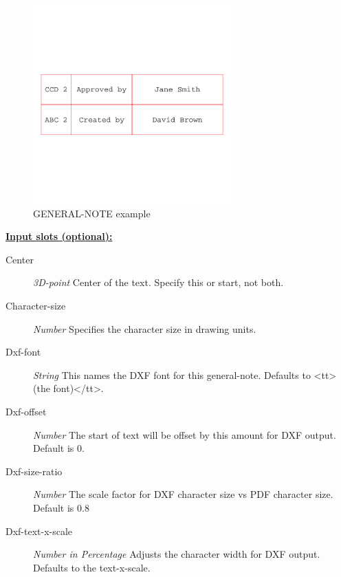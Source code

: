 \documentclass [11pt]{book}
\begin{document}
\begin{itemize}
\begin{figure}
\begin{center}
\includegraphics[width=3in,height=3in]{../images/example-GENERAL-NOTE.pdf}
\end{center}

\caption{GENERAL-NOTE example}

\label{fig:GENERAL-NOTE}

\end{figure}





\textbf{
\underline{Input slots (optional):}}

\begin{description}

\item [Center]
\emph{3D-point} Center of the text. Specify this or start, not both.


\item [Character-size]
\emph{Number} Specifies the character size in drawing units.


\item [Dxf-font]
\emph{String} This names the DXF font for this general-note. Defaults to <tt>(the font)</tt>.


\item [Dxf-offset]
\emph{Number} The start of text will be offset by this amount for DXF output. Default is 0.


\item [Dxf-size-ratio]
\emph{Number} The scale factor for DXF character size vs PDF character size. Default is 0.8


\item [Dxf-text-x-scale]
\emph{Number in Percentage} Adjusts the character width for DXF output. Defaults to the text-x-scale.



\end{description}
\end{itemize}
\end{document}
